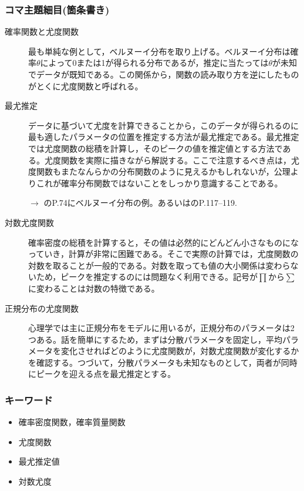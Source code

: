 \subsubsection{コマ主題細目(箇条書き)}
\begin{description}
	\item[確率関数と尤度関数]最も単純な例として，ベルヌーイ分布を取り上げる。ベルヌーイ分布は確率$\theta$によって0または1が得られる分布であるが，推定に当たっては$\theta$が未知でデータが既知である。この関係から，関数の読み取り方を逆にしたものがとくに尤度関数と呼ばれる。

	\item[最尤推定]データに基づいて尤度を計算できることから，このデータが得られるのに最も適したパラメータの位置を推定する方法が最尤推定である。最尤推定では尤度関数の総積を計算し，そのピークの値を推定値とする方法である。尤度関数を実際に描きながら解説する。ここで注意するべき点は，尤度関数もまたなんらかの分布関数のように見えるかもしれないが，公理よりこれが確率分布関数ではないことをしっかり意識することである。
	      \begin{flushright}
		      $\to$ \textcite{Nojima201903}のP.74にベルヌーイ分布の例。あるいは\textcite{kosugi2018}のP.117--119.
	      \end{flushright}


	\item[対数尤度関数]確率密度の総積を計算すると，その値は必然的にどんどん小さなものになっていき，計算が非常に困難である。そこで実際の計算では，尤度関数の対数を取ることが一般的である。対数を取っても値の大小関係は変わらないため，ピークを推定するのには問題なく利用できる。記号が$\prod$から$\sum$に変わることは対数の特徴である。

	\item[正規分布の尤度関数]心理学では主に正規分布をモデルに用いるが，正規分布のパラメータは2つある。話を簡単にするため，まずは分散パラメータを固定し，平均パラメータを変化させればどのように尤度関数が，対数尤度関数が変化するかを確認する。つづいて，分散パラメータも未知なものとして，両者が同時にピークを迎える点を最尤推定とする。

\end{description}
\subsubsection{キーワード}
\begin{itemize}
	\item 確率密度関数，確率質量関数
	\item 尤度関数
	\item 最尤推定値
	\item 対数尤度
\end{itemize}
